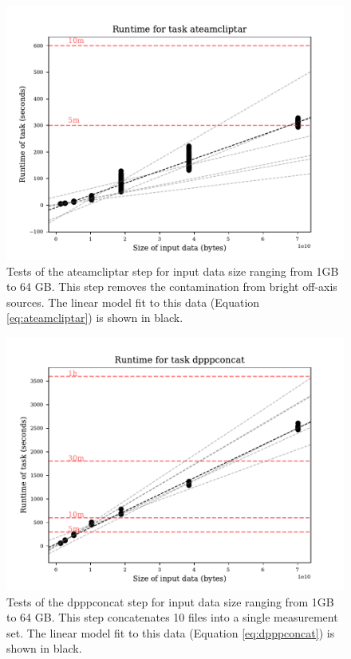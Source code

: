 \documentclass[preprint,5p]{elsarticle}
\begin{document}
\begin{figure}
    \includegraphics[width=0.95\linewidth]{figures/ateamcliptar_size.pdf}
      \caption{Tests of the ateamcliptar step for input data size ranging from 1GB to 64 GB. This step removes the contamination from bright off-axis sources. The linear model fit to this data (Equation \ref{eq:ateamcliptar}) is shown in black.}
	\label{fig:ateamcliptar}
\end{figure}

\begin{figure}
    \includegraphics[width=0.95\linewidth]{figures/dpppconcat_size.pdf}
      \caption{Tests of the dpppconcat step for input data size ranging from 1GB to 64 GB. This step concatenates 10 files into a single measurement set. The linear model fit to this data (Equation \ref{eq:dpppconcat}) is shown in black.}
	\label{fig:dpppconcat_size}
\end{figure}
\end{document}
